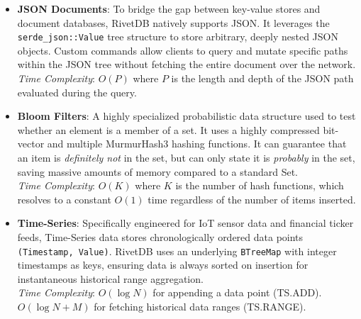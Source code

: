 \begin{itemize}[leftmargin=2.5em]
    \item \textbf{JSON Documents}: To bridge the gap between key-value stores and document databases, RivetDB natively supports JSON. It leverages the \texttt{serde\_json::Value} tree structure to store arbitrary, deeply nested JSON objects. Custom commands allow clients to query and mutate specific paths within the JSON tree without fetching the entire document over the network. \\
    \textit{Time Complexity}: $O(P)$ where $P$ is the length and depth of the JSON path evaluated during the query.
    
    \item \textbf{Bloom Filters}: A highly specialized probabilistic data structure used to test whether an element is a member of a set. It uses a highly compressed bit-vector and multiple MurmurHash3 hashing functions. It can guarantee that an item is \textit{definitely not} in the set, but can only state it is \textit{probably} in the set, saving massive amounts of memory compared to a standard Set. \\
    \textit{Time Complexity}: $O(K)$ where $K$ is the number of hash functions, which resolves to a constant $O(1)$ time regardless of the number of items inserted.
    
    \item \textbf{Time-Series}: Specifically engineered for IoT sensor data and financial ticker feeds, Time-Series data stores chronologically ordered data points \texttt{(Timestamp, Value)}. RivetDB uses an underlying \texttt{BTreeMap} with integer timestamps as keys, ensuring data is always sorted on insertion for instantaneous historical range aggregation. \\
    \textit{Time Complexity}: $O(\log N)$ for appending a data point (TS.ADD). $O(\log N + M)$ for fetching historical data ranges (TS.RANGE).
\end{itemize}

